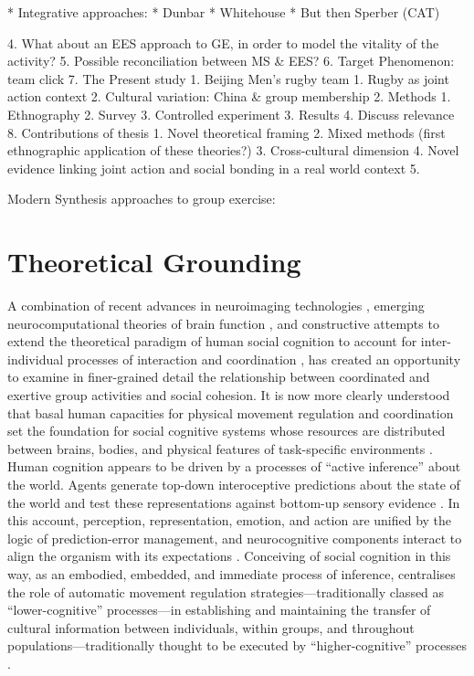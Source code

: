* Integrative approaches:
    * Dunbar
    * Whitehouse
    * But then Sperber (CAT)






4. What about an EES approach to GE, in order to model the vitality of the activity?
5. Possible reconciliation between MS & EES?
6. Target Phenomenon: team click
7. The Present study
    1. Beijing Men’s rugby team
        1. Rugby as joint action context
        2. Cultural variation: China & group membership
    2. Methods
        1. Ethnography
        2. Survey
        3. Controlled experiment
    3. Results
    4. Discuss relevance
8. Contributions of thesis
    1. Novel theoretical framing
    2. Mixed methods (first ethnographic application of these theories?)
    3. Cross-cultural dimension
    4. Novel evidence linking joint action and social bonding in a real world context
    5.


Modern Synthesis approaches to group exercise:
















\section{Theoretical Grounding}
A combination of recent advances in neuroimaging technologies \citep{Frith2007}, emerging neurocomputational theories of brain function \citep{Friston2010,Frith2010,Clark2013}, and constructive attempts to extend the theoretical paradigm of human social cognition to account for inter-individual processes of interaction and coordination \citep{Sebanz2006,Dale2014}, has created an opportunity to examine in finer-grained detail the relationship between coordinated and exertive group activities and social cohesion.  It is now more clearly understood that basal human capacities for physical movement regulation and coordination set the foundation for social cognitive systems whose resources are distributed between brains, bodies, and physical features of task-specific environments \citep{Hutchins2000,Kirsh2006,Semin2008,Semin2012,Coey2012}.
Human cognition appears to be driven by a processes of ``active inference'' \citep{Friston2010} about the world.  Agents generate top-down interoceptive predictions about the state of the world and test these representations against bottom-up sensory evidence \citep{Clark2013}.  In this account, perception, representation, emotion, and action are unified by the logic of prediction-error management, and neurocognitive components interact to align the organism with its expectations \citep{Pezzulo2014}.  Conceiving of social cognition in this way, as an embodied, embedded, and immediate process of inference, centralises the role of automatic movement regulation strategies---traditionally classed as ``lower-cognitive'' processes---in establishing and maintaining the transfer of cultural information between individuals, within groups, and throughout populations---traditionally thought to be executed by  ``higher-cognitive'' processes \citep{Claidiere2014}.

